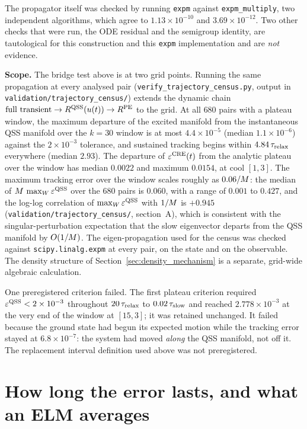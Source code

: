 The propagator itself was checked by running \texttt{expm} against
\texttt{expm\_multiply}, two independent algorithms, which agree to
$1.13\times10^{-10}$ and $3.69\times10^{-12}$. Two other checks that were run,
the ODE residual and the semigroup identity, are tautological for this
construction and this \texttt{expm} implementation and are \emph{not} evidence.

\textbf{Scope.} The bridge test above is at two grid points. Running the same
propagation at every analysed pair (\texttt{verify\_trajectory\_census.py},
output in \texttt{validation/trajectory\_census/}) extends the dynamic chain
$\text{full transient}\to R^{\mathrm{QSS}}(u(t))\to R^{\mathrm{PE}}$ to the grid. At all $680$ pairs
with a plateau window, the maximum departure of the excited manifold from the
instantaneous QSS manifold over the $k=30$ window is at most
$4.4\times10^{-5}$ (median $1.1\times10^{-6}$) against the $2\times10^{-3}$
tolerance, and sustained tracking begins within $4.84\,\tau_{\mathrm{relax}}$ everywhere
(median $2.93$). The departure of $\varepsilon^{\mathrm{CRE}}(t)$ from the analytic plateau over
the window has median $0.0022$ and maximum $0.0154$, at cool $[1,3]$. The
maximum tracking error over the window scales roughly as $0.06/M$: the
median of $M\,\max_W\varepsilon^{\mathrm{QSS}}$ over the $680$ pairs is $0.060$, with a
range of $0.001$ to $0.427$, and the log-log correlation of $\max_W\varepsilon^{\mathrm{QSS}}$
with $1/M$ is $+0.945$ (\texttt{validation/trajectory\_census/},
section~A), which is consistent with the singular-perturbation expectation that the slow
eigenvector departs from the QSS manifold by $O(1/M)$. The
eigen-propagation used for the census was checked against
\texttt{scipy.linalg.expm} at every pair, on the state and on the observable.
The density structure of Section~\ref{sec:density_mechanism} is a separate,
grid-wide algebraic calculation.

One preregistered criterion failed. The first plateau criterion required
$\varepsilon^{\mathrm{QSS}} < 2\times10^{-3}$ throughout $20\,\tau_{\mathrm{relax}}$ to $0.02\,\tau_{\mathrm{slow}}$ and
reached $2.778\times10^{-3}$ at the very end of the window at $[15,3]$; it was
retained unchanged. It failed because the ground state had begun its expected
motion while the tracking error stayed at $6.8\times10^{-7}$: the system had
moved \emph{along} the QSS manifold, not off it. The replacement interval
definition used above was not preregistered.

\section{How long the error lasts, and what an ELM averages}
\label{sec:persistence}

